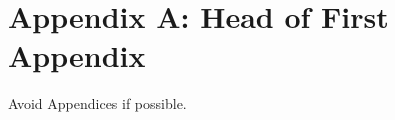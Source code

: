 \documentclass[twocolumn,10pt]{asme2ej}
\begin{document}
\section*{Appendix A: Head of First Appendix}
Avoid Appendices if possible.

\end{document}
